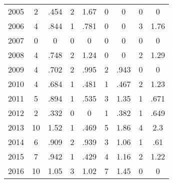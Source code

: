 \begin{table}[htbp]
\begin{tabular}{l*{8}{c}}
2005      &        2&     .454&        2&     1.67&        0&        0&        0&        0\\
2006      &        4&     .844&        1&     .781&        0&        0&        3&     1.76\\
2007      &        0&        0&        0&        0&        0&        0&        0&        0\\
2008      &        4&     .748&        2&     1.24&        0&        0&        2&     1.29\\
2009      &        4&     .702&        2&     .995&        2&     .943&        0&        0\\
2010      &        4&     .684&        1&     .481&        1&     .467&        2&     1.23\\
2011      &        5&     .894&        1&     .535&        3&     1.35&        1&     .671\\
2012      &        2&     .332&        0&        0&        1&     .382&        1&     .649\\
2013      &       10&     1.52&        1&     .469&        5&     1.86&        4&      2.3\\
2014      &        6&     .909&        2&     .939&        3&     1.06&        1&      .61\\
2015      &        7&     .942&        1&     .429&        4&     1.16&        2&     1.22\\
2016      &       10&     1.05&        3&     1.02&        7&     1.45&        0&        0\\
\hline\hline
\end{tabular}
\end{table}
